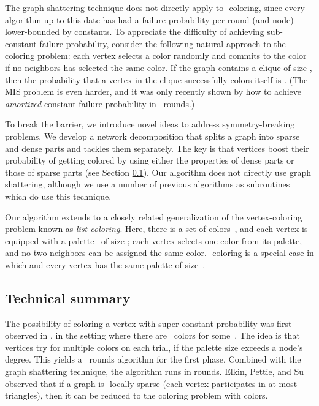 \documentclass[11pt]{amsart}
\begin{document}
\begin{enumerate}
The graph shattering technique does not directly apply to -coloring, since every algorithm up to this date has had a failure probability per round (and node) lower-bounded by constants. To appreciate the difficulty of achieving sub-constant failure probability, consider the following natural approach to the -coloring problem: each vertex selects a color randomly and commits to the color if no neighbors has selected the same color. If the graph contains a clique of size , then the probability that a vertex in the clique successfully colors itself is . (The MIS problem is even harder, and it was only recently shown by \cite{Moh16} how to achieve {\it amortized} constant  failure probability in ~rounds.)

To break the  barrier, we introduce novel ideas to address symmetry-breaking problems. We develop a network decomposition that splits a graph into sparse and dense parts and tackles them separately. The key is that vertices boost their probability of getting colored by using either the properties of dense parts or those of sparse parts (see Section \ref{sec:technical}). Our algorithm does not directly use graph shattering, although we use a number of previous algorithms as subroutines which do use this technique.
\end{enumerate}

Our algorithm extends to a closely related generalization of the vertex-coloring problem known as \emph{list-coloring}. Here, there is a set of colors~, and each vertex is equipped with a palette~ of size ; each vertex selects one color from its palette, and no two neighbors can be assigned the same color. -coloring is a special case in which  and every vertex has the same palette of size~. 

\subsection{Technical summary}\label{sec:technical}


The possibility of coloring a vertex with super-constant probability was first observed in \cite{Sch10, elk15}, in the setting where there are~ colors for some~. The idea is that vertices try for multiple colors on each trial, if the palette size exceeds a node's degree. This yields a~ rounds algorithm for the first phase. Combined with the graph shattering technique, the algorithm runs in  rounds. Elkin, Pettie, and Su~\cite{elk15} observed that if a graph is -locally-sparse (each vertex participates in at most  triangles), then it can be reduced to the coloring problem with  colors.
\end{document}
